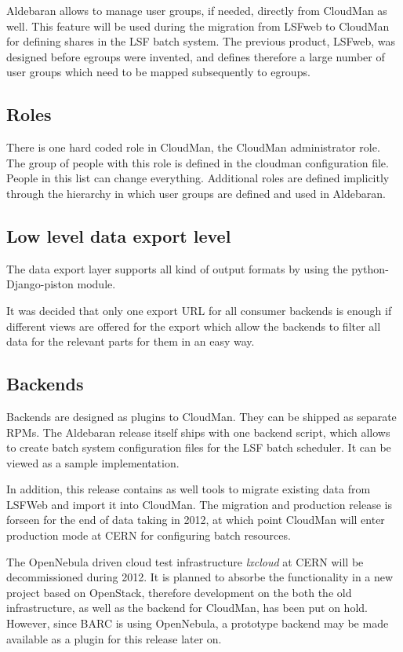 \documentclass[12pt]{article}
\begin{document}
Aldebaran allows to manage user groups, if needed, directly from CloudMan as well.
This feature will be used during the migration from LSFweb to CloudMan for defining shares in the LSF batch system. The previous product, LSFweb, was designed before egroups were invented, and defines therefore a large number of user groups which need to be mapped subsequently to egroups. 

\subsection{Roles}
There is one hard coded role in CloudMan, the CloudMan administrator role. The group of people with this role is
defined in the cloudman configuration file. People in this list can change everything.
Additional roles are defined implicitly through the hierarchy in which user groups are defined and used in Aldebaran.

\subsection{Low level data export level}
The data export layer supports all kind of output formats by using the 
python-Django-piston module. 

It was decided that only one export URL for all consumer backends is enough if different views are offered for the export which allow the backends to filter all
data for the relevant parts for them in an easy way. 

\subsection{Backends}
Backends are designed as plugins to CloudMan. They can be shipped as separate RPMs. 
The Aldebaran release itself ships with one backend script, which allows to create batch system 
configuration files for the LSF batch scheduler. It can be viewed as a sample implementation. 

In addition, this release contains as well tools to migrate existing data from LSFWeb and 
import it into CloudMan. The migration and production release is forseen for 
the end of data taking in 2012, at which point CloudMan will enter production 
mode at CERN for configuring batch resources. 

The OpenNebula driven cloud test infrastructure {\it lxcloud} at CERN will be 
decommissioned during 2012. It is planned to absorbe the functionality in a new 
project based on OpenStack, therefore development on the both the old 
infrastructure, as well as the backend for CloudMan, has been put on hold.
However, since BARC is using OpenNebula, a prototype backend may be made available 
as a plugin for this release later on. 
\end{document}
